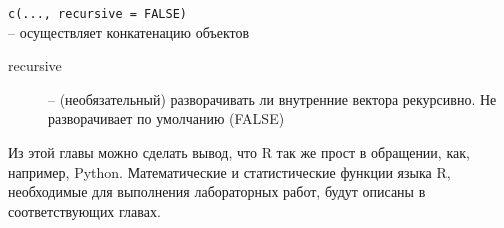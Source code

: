     \begin{mdframed}[style=BadassFrame]
        \texttt{c(..., recursive = FALSE)} \\
        -- осуществляет конкатенацию объектов
        \begin{description}
            \item[recursive] -- (необязательный) разворачивать ли внутренние 
                вектора рекурсивно. Не разворачивает по умолчанию (FALSE)
        \end{description}
    \end{mdframed}

    \indent Из этой главы можно сделать вывод, что R так же прост в обращении, как, например, 
    Python. Математические и статистические функции языка R, необходимые для выполнения 
    лабораторных работ, будут описаны в соответствующих главах.
